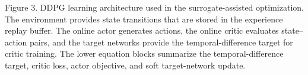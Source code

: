 Figure 3. DDPG learning architecture used in the surrogate-assisted
optimization. The environment provides state transitions that are stored
in the experience replay buffer. The online actor generates actions, the
online critic evaluates state--action pairs, and the target networks
provide the temporal-difference target for critic training. The lower
equation blocks summarize the temporal-difference target, critic loss,
actor objective, and soft target-network update.
